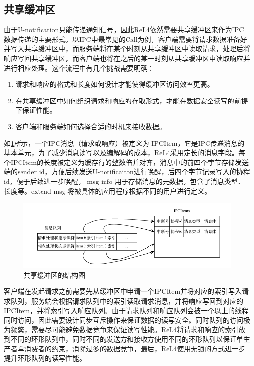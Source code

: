 \subsection{共享缓冲区}
由于U-notification只能传递通知信号，因此ReL4依然需要共享缓冲区来作为IPC数据传递的主要形式。以IPC中最常见的Call为例，客户端需要将请求数据准备好并写入共享缓冲区中，而服务端将在某个时刻从共享缓冲区中读取请求，处理后将响应写回共享缓冲区，而客户端也将在之后的某一时刻从共享缓冲区中读取响应并进行相应处理。这个流程中有几个挑战需要明确：
\begin{enumerate}
  \item 请求和响应的格式和长度如何设计才能使得缓冲区访问效率更高。
  \item 在共享缓冲区中如何组织请求和响应的存取形式，才能在数据安全读写的前提下保证性能。
  \item 客户端和服务端如何选择合适的时机来接收数据。
\end{enumerate}

如\ref{fig:ipcitem}所示，一个IPC消息（请求或响应）被定义为 IPCItem，它是IPC传递消息的基本单元，为了减少消息读写以及编解码的成本，ReL4采用定长的消息字段。每个IPCItem的长度被定义为缓存行的整数倍并对齐，消息中的前四个字节存储发送端的sender id，方便后续发送U-notificaiton进行唤醒，后四个字节记录写入的协程id，便于后续进一步唤醒， msg info 用于存储消息的元数据，包含了消息类型、长度等。extend msg 将被具体的应用程序根据不同的用户进行定义。

\begin{figure}[htbp]
  \centering
  \includegraphics[width=1.0\textwidth]{figures/IPCItem.pdf}
  \caption{共享缓冲区的结构图}\label{fig:ipcitem}
\end{figure}

客户端在发起请求之前需要先从缓冲区中申请一个IPCItem并将对应的索引写入请求队列，服务端会根据请求队列中的索引读取请求消息，并将响应写回到对应的IPCItem，并将索引写入响应队列。由于请求队列和响应队列会被一个以上的线程同时访问，因此需要设计同步互斥操作来保证数据的读写安全。同时队列的访问极为频繁，需要尽可能避免数据竞争来保证读写性能。ReL4将请求和响应的索引放到不同的环形队列中，同时不同的发送方和接收方使用不同的环形队列以保证单生产者单消费者的约束，消除过多的数据竞争，最后，ReL4使用无锁的方式\cite{barnes1993method}进一步提升环形队列的读写性能。

